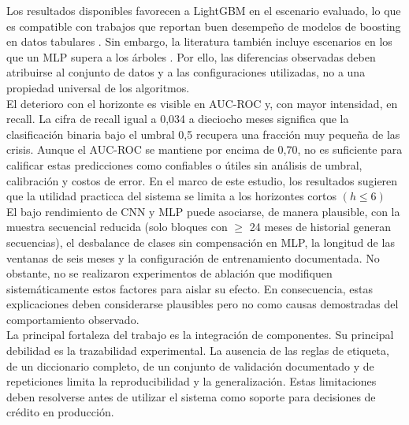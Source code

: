 Los resultados disponibles favorecen a LightGBM en el escenario evaluado, lo que es compatible con trabajos que reportan buen desempeño de modelos de boosting en datos tabulares \cite{lessmann2015benchmarking, moscato2021benchmark}. Sin embargo, la literatura también incluye escenarios en los que un MLP supera a los árboles \cite{gunnarsson2021deep}. Por ello, las diferencias observadas deben atribuirse al conjunto de datos y a las configuraciones utilizadas, no a una propiedad universal de los algoritmos.\\

El deterioro con el horizonte es visible en AUC-ROC y, con mayor intensidad, en recall. La cifra de recall igual a 0,034 a dieciocho meses significa que la clasificación binaria bajo el umbral 0,5 recupera una fracción muy pequeña de las crisis. Aunque el AUC-ROC se mantiene por encima de 0,70, no es suficiente para calificar estas predicciones como confiables o útiles sin análisis de umbral, calibración y costos de error. En el marco de este estudio, los resultados sugieren que la utilidad practicca del sistema se limita a los horizontes cortos $(h \le 6) $\\

El bajo rendimiento de CNN y MLP puede asociarse, de manera plausible, con la muestra secuencial reducida (solo bloques con $\ge$ 24 meses de historial generan secuencias), el desbalance de clases sin compensación en MLP, la longitud de las ventanas de seis meses y la configuración de entrenamiento documentada. No obstante, no se realizaron experimentos de ablación que modifiquen sistemáticamente estos factores para aislar su efecto. En consecuencia, estas explicaciones deben considerarse plausibles pero no como causas demostradas del comportamiento observado.\\

La principal fortaleza del trabajo es la integración de componentes. Su principal debilidad es la trazabilidad experimental. La ausencia de las reglas de etiqueta, de un diccionario completo, de un conjunto de validación documentado y de repeticiones limita la reproducibilidad y la generalización. Estas limitaciones deben resolverse antes de utilizar el sistema como soporte para decisiones de crédito en producción.
